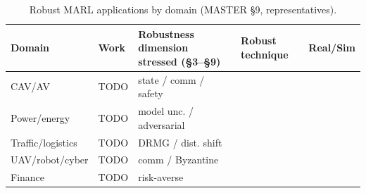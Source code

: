 \begin{table}[t]\centering\footnotesize
\caption{Robust MARL applications by domain (MASTER \S9, representatives).}
\label{tab:apps}
\begin{tabular}{lllll}
\toprule
Domain & Work & Robustness dimension stressed (\S3--\S9) & Robust technique & Real/Sim \\
\midrule
CAV/AV       & TODO & state / comm / safety & & \\
Power/energy & TODO & model unc. / adversarial & & \\
Traffic/logistics & TODO & DRMG / dist. shift & & \\
UAV/robot/cyber   & TODO & comm / Byzantine & & \\
Finance      & TODO & risk-averse & & \\
\bottomrule
\end{tabular}
\end{table}

